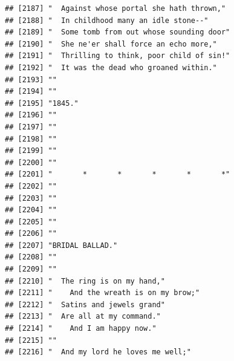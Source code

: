 \documentclass{article}\usepackage[]{graphicx}\usepackage[]{color}
\makeatletter
\newenvironment{kframe}{%
 \def\at@end@of@kframe{}%
 \ifinner\ifhmode%
  \def\at@end@of@kframe{\end{minipage}}%
  \begin{minipage}{\columnwidth}%
 \fi\fi%
 \def\FrameCommand##1{\hskip\@totalleftmargin \hskip-\fboxsep
 \colorbox{shadecolor}{##1}\hskip-\fboxsep
     \hskip-\linewidth \hskip-\@totalleftmargin \hskip\columnwidth}%
 \MakeFramed {\advance\hsize-\width
   \@totalleftmargin\z@ \linewidth\hsize
   \@setminipage}}%
 {\par\unskip\endMakeFramed%
 \at@end@of@kframe}
\newenvironment{knitrout}{}{} %
\makeatother
\begin{document}
\begin{knitrout}
\begin{kframe}
\begin{verbatim}
## [2187] "  Against whose portal she hath thrown,"                                     
## [2188] "  In childhood many an idle stone--"                                         
## [2189] "  Some tomb from out whose sounding door"                                    
## [2190] "  She ne'er shall force an echo more,"                                       
## [2191] "  Thrilling to think, poor child of sin!"                                    
## [2192] "  It was the dead who groaned within."                                       
## [2193] ""                                                                            
## [2194] ""                                                                            
## [2195] "1845."                                                                       
## [2196] ""                                                                            
## [2197] ""                                                                            
## [2198] ""                                                                            
## [2199] ""                                                                            
## [2200] ""                                                                            
## [2201] "       *       *       *       *       *"                                    
## [2202] ""                                                                            
## [2203] ""                                                                            
## [2204] ""                                                                            
## [2205] ""                                                                            
## [2206] ""                                                                            
## [2207] "BRIDAL BALLAD."                                                              
## [2208] ""                                                                            
## [2209] ""                                                                            
## [2210] "  The ring is on my hand,"                                                   
## [2211] "    And the wreath is on my brow;"                                           
## [2212] "  Satins and jewels grand"                                                   
## [2213] "  Are all at my command."                                                    
## [2214] "    And I am happy now."                                                     
## [2215] ""                                                                            
## [2216] "  And my lord he loves me well;"                                             

\end{verbatim}
\end{kframe}
\end{knitrout}
\end{document}
